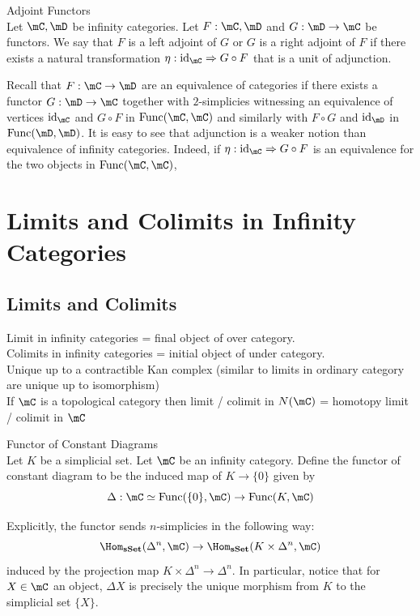 \documentclass[a4paper]{article}
\begin{document}
\begin{defn}{Adjoint Functors}{}\\ Let $\mC,\mD$ be infinity categories. Let $F:\mC,\mD$ and $G:\mD\to\mC$ be functors. We say that $F$ is a left adjoint of $G$ or $G$ is a right adjoint of $F$ if there exists a natural transformation $\eta:\text{id}_\mC\Rightarrow G\circ F$ that is a unit of adjunction. 
\end{defn}

Recall that $F:\mC\to\mD$ are an equivalence of categories if there exists a functor $G:\mD\to\mC$ together with $2$-simplicies witnessing an equivalence of vertices $\text{id}_\mC$ and $G\circ F$ in $\text{Func}(\mC,\mC)$ and similarly with $F\circ G$ and $\text{id}_\mD$ in $\text{Func}(\mD,\mD)$. It is easy to see that adjunction is a weaker notion than equivalence of infinity categories. Indeed, if $\eta:\text{id}_\mC\Rightarrow G\circ F$ is an equivalence for the two objects in $\text{Func}(\mC,\mC)$, 

\pagebreak
\section{Limits and Colimits in Infinity Categories}
\subsection{Limits and Colimits}
Limit in infinity categories = final object of over category. \\
Colimits in infinity categories = initial object of under category. \\

Unique up to a contractible Kan complex (similar to limits in ordinary category are unique up to isomorphism)\\

If $\mC$ is a topological category then limit / colimit in $N(\mC)$ = homotopy limit / colimit in $\mC$






\begin{defn}{Functor of Constant Diagrams}{}\\ Let $K$ be a simplicial set. Let $\mC$ be an infinity category. Define the functor of constant diagram to be the induced map of $K\to\{0\}$ given by $$\Delta:\mC\simeq\text{Func}(\{0\},\mC)\to\text{Func}(K,\mC)$$
\end{defn}

Explicitly, the functor sends $n$-simplicies in the following way: $$\Hom_\bold{sSet}(\Delta^n,\mC)\to\Hom_\bold{sSet}(K\times\Delta^n,\mC)$$ induced by the projection map $K\times\Delta^n\to\Delta^n$. In particular, notice that for $X\in\mC$ an object, $\Delta X$ is precisely the unique morphism from $K$ to the simplicial set $\{X\}$. 
\end{document}
